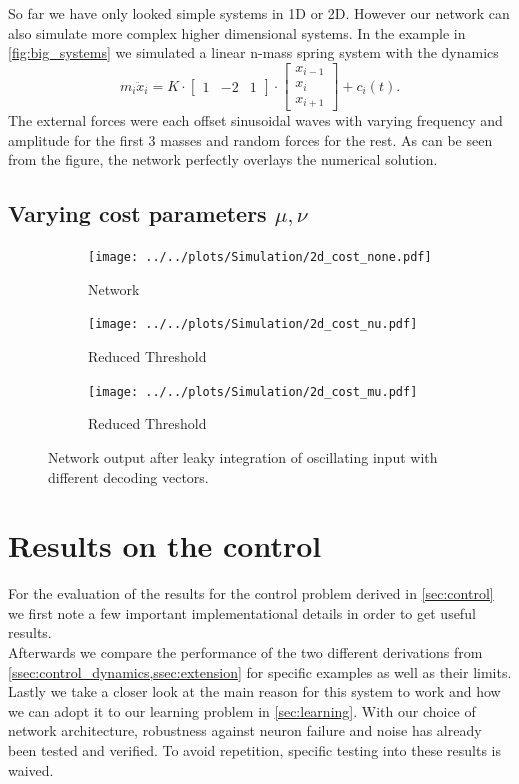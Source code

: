 So far we have only looked simple systems in 1D or 2D. However our network can also simulate more complex higher dimensional systems.
In the example in \cref{fig:big_systems} we simulated a linear n-mass spring system with the dynamics
\begin{equation}
	m_i\ddot{x}_i = K\cdot \begin{bmatrix}
	1&-2&1
	\end{bmatrix} \cdot	\begin{bmatrix}
	x_{i-1}\\
	x_i\\
	x_{i+1}
	\end{bmatrix} + c_i(t).
\end{equation}
The external forces were each offset sinusoidal waves with varying frequency and amplitude for the first 3 masses and random forces for the rest. As can be seen from the figure, the network perfectly overlays the numerical solution.


\subsection{Varying cost parameters $\mu,\nu$}
\begin{figure}[h!]
	\centering
	\begin{subfigure}[t]{0.6\textwidth}
		\centering
		\texttt{[image: ../../plots/Simulation/2d\_cost\_none.pdf]}
		\caption{Network }
		\label{fig:sim_no_cost}
	\end{subfigure}
	\hfill
	\begin{subfigure}[t]{0.6\textwidth}
		\centering
		\texttt{[image: ../../plots/Simulation/2d\_cost\_nu.pdf]}
		\caption{Reduced Threshold}
		\label{fig:sim_nu_cost}
	\end{subfigure}
	\hfill
	\begin{subfigure}[t]{0.6\textwidth}
		\centering
		\texttt{[image: ../../plots/Simulation/2d\_cost\_mu.pdf]}
		\caption{Reduced Threshold}
		\label{fig:sim_mu_cost}
	\end{subfigure}
	\caption{Network output after leaky integration of oscillating input with different decoding vectors.}
	\label{fig:sim_res_4}
\end{figure}

\section{Results on the control}\label{sec:res_control}
For the evaluation of the results for the control problem derived in \cref{sec:control} we first note a few important implementational details in order to get useful results. \\
Afterwards we compare the performance of the two different derivations from \cref{ssec:control_dynamics,ssec:extension} for specific examples as well as their limits.\\
Lastly we take a closer look at the main reason for this system to work and how we can adopt it to our learning problem in \cref{sec:learning}.
With our choice of network architecture, robustness against neuron failure and noise has already been tested and verified. To avoid repetition, specific testing into these results is waived.
